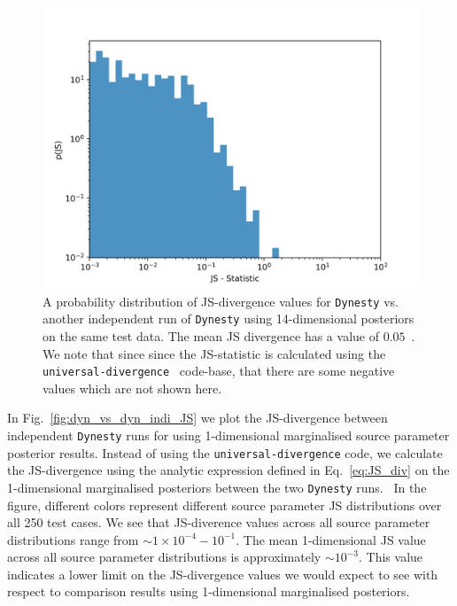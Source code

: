 %
%

\begin{figure}
    \includegraphics[width=\columnwidth]{figures/dynesty-dynesty_fullJS.png}
    \caption[\texttt{Dynesty} vs. \texttt{Dynesty} 14-dimensional \ac{JS} divergence probability distribution plot.]{\label{fig:dyn_vs_dyn_ful14D_JS} A probability distribution of \ac{JS}-divergence values for \texttt{Dynesty} vs. another independent run of \texttt{Dynesty} using 14-dimensional 
    posteriors on the same test data. The mean \ac{JS} divergence has a value of $0.05$~. We note that since since the \ac{JS}-statistic is calculated using the \texttt{universal-divergence}~\cite{4839047} code-base, that there are some negative values which are not shown here.~}
\end{figure}

%
%
In Fig.~\ref{fig:dyn_vs_dyn_indi_JS} we plot the \ac{JS}-divergence 
between independent \texttt{Dynesty} runs for using 
1-dimensional marginalised source parameter posterior results. Instead of 
using the \texttt{universal-divergence} code, we
calculate the \ac{JS}-divergence using the analytic expression 
defined in Eq.~\ref{eq:JS_div} on the 1-dimensional marginalised posteriors 
between the two \texttt{Dynesty} runs.~ In the figure, different colors 
represent different source parameter \ac{JS} distributions over all 
250 test cases. We see 
that \ac{JS}-diverence values across all source parameter distributions 
range from $\sim1 \times 10^{-4} - 10^{-1}$. 
The mean 1-dimensional \ac{JS} value across all source parameter distributions
is 
approximately $\sim 10^{-3}$. This value indicates a lower limit 
on the \ac{JS}-divergence values we would expect to see with respect to 
comparison results using 1-dimensional marginalised posteriors. 

